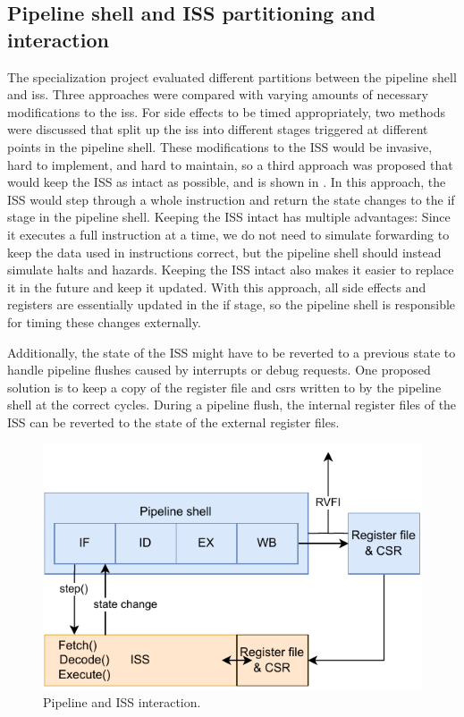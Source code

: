 \subsection{Pipeline shell and ISS partitioning and interaction}
\label{sec:pw_partition}

The specialization project evaluated different partitions between the pipeline shell and \acrshort{iss}. Three approaches were compared with varying amounts of necessary modifications to the \acrshort{iss}. For side effects to be timed appropriately, two methods were discussed that split up the \acrshort{iss} into different stages triggered at different points in the pipeline shell. These modifications to the ISS would be invasive, hard to implement, and hard to maintain, so a third approach was proposed that would keep the ISS as intact as possible, and is shown in . In this approach, the ISS would step through a whole instruction and return the state changes to the \acrshort{if} stage in the pipeline shell. Keeping the ISS intact has multiple advantages: Since it executes a full instruction at a time, we do not need to simulate forwarding to keep the data used in instructions correct, but the pipeline shell should instead simulate halts and hazards. Keeping the ISS intact also makes it easier to replace it in the future and keep it updated. With this approach, all side effects and registers are essentially updated in the \acrshort{if} stage, so the pipeline shell is responsible for timing these changes externally.

Additionally, the state of the ISS might have to be reverted to a previous state to handle pipeline flushes caused by interrupts or debug requests. One proposed solution is to keep a copy of the register file and \acrshort{csr}s written to by the pipeline shell at the correct cycles. During a pipeline flush, the internal register files of the ISS can be reverted to the state of the external register files.


\begin{figure}[htb]
    \centering
    \includegraphics[width=0.5\linewidth]{figures/pipeline-iss-3.pdf}
    \caption{Pipeline and ISS interaction.}
    \label{fig:pipeline-iss-3}
\end{figure}


